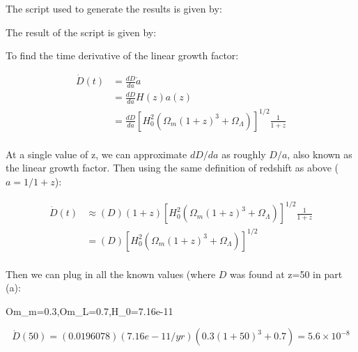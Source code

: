 The script used to generate the results is given by:




The result of the script is given by:




To find the time derivative of the linear growth factor:

\begin{align}
  \dot{D}(t) &= \frac{dD}{da}\dot{a} \\
             &= \frac{dD}{da}H(z)a(z)\\
             &= \frac{dD}{da}\left[H_0^2(\Omega_m(1+z)^3+\Omega_\Lambda)\right]^{1/2}\frac{1}{1+z}\\
\end{align}

At a single value of z, we can approximate $dD/da$ as roughly $D/a$, also known as the linear growth factor. Then using the same definition of redshift as above ($a=1/1+z$):

\begin{align}
  \dot{D}(t) &\approx (D)(1+z)\left[H_0^2(\Omega_m(1+z)^3+\Omega_\Lambda)\right]^{1/2}\frac{1}{1+z}\\
             &=(D)\left[H_0^2(\Omega_m(1+z)^3+\Omega_\Lambda)\right]^{1/2}\\
\end{align}

Then we can plug in all the known values (where $D$ was found at z=50 in part (a):

Om_m=0.3,Om_L=0.7,H_0=7.16e-11

\begin{equation}
  \dot{D}(50) = (0.0196078)(7.16e-11/yr)(0.3(1+50)^3+0.7) = 5.6 \times 10^{-8}
\end{equation}

